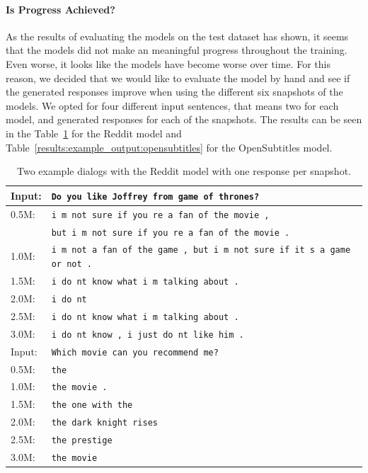\paragraph{Is Progress Achieved?} As the results of evaluating the models on the test dataset has shown, it seems that the models did not make an meaningful progress throughout the training. Even worse, it looks like the models have become worse over time. For this reason, we decided that we would like to evaluate the model by hand and see if the generated responses improve when using the different six snapshots of the models. We opted for four different input sentences, that means two for each model, and generated responses for each of the snapshots. The results can be seen in the Table~\ref{results:example_output:reddit} for the Reddit model and Table~\ref{results:example_output:opensubtitles} for the OpenSubtitles model.

\begin{table}[H]
	\centering
	\begin{adjustbox}{max width=\textwidth}
		\begin{tabular}{ll}
			\toprule
			Input: 	& \texttt{Do you like Joffrey from game of thrones?}\\
			\midrule
			0.5M: 	& \texttt{i m not sure if you re a fan of the movie ,}\\
			& \texttt{but i m not sure if you re a fan of the movie .}\\
			1.0M: 	& \texttt{i m not a fan of the game , but i m not sure if it s a game or not .}\\
			1.5M:	& \texttt{i do nt know what i m talking about .}\\
			2.0M:	& \texttt{i do nt }\\
			2.5M:	& \texttt{i do nt know what i m talking about .}\\
			3.0M:	& \texttt{i do nt know , i just do nt like him .}\\
			\midrule
			Input: 	& \texttt{Which movie can you recommend me?}\\
			\midrule
			0.5M: 	& \texttt{the}\\
			1.0M: 	& \texttt{the movie .}\\
			1.5M:	& \texttt{the one with the}\\
			2.0M:	& \texttt{the dark knight rises}\\
			2.5M:	& \texttt{the prestige}\\
			3.0M:	& \texttt{the movie}\\
			\bottomrule
		\end{tabular}
	\end{adjustbox}
	\caption{Two example dialogs with the Reddit model with one response per snapshot.}
	\label{results:example_output:reddit}
\end{table}

